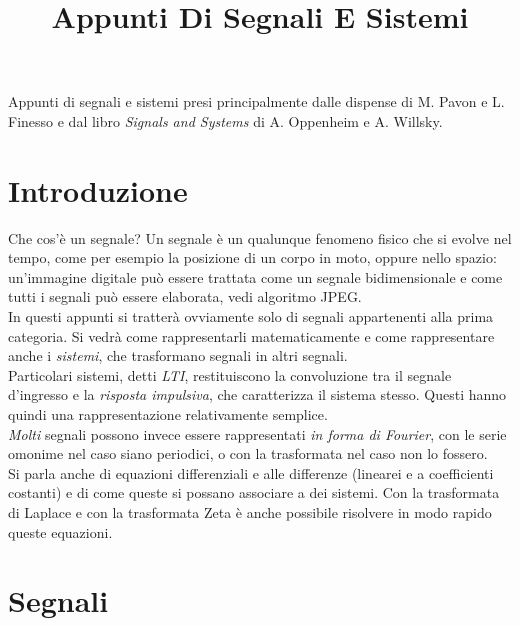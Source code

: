 \documentclass[a4paper,portrait,12pt]{article}
\theoremstyle{definition}
\begin{document}
\title{Appunti Di Segnali E Sistemi}

\maketitle
\date
\newpage

\tableofcontents
\newpage

Appunti di segnali e sistemi presi principalmente dalle dispense di M. Pavon e L. Finesso e dal libro 
\textit{Signals and Systems} di A. Oppenheim e A. Willsky.


\section{Introduzione}

Che cos'è un segnale? Un segnale è un qualunque fenomeno fisico che si evolve nel tempo, come per esempio la 
posizione di un corpo in moto, oppure nello spazio: un'immagine digitale può essere trattata come un segnale
bidimensionale e come tutti i segnali può essere elaborata, vedi algoritmo JPEG.\\
In questi appunti si tratterà ovviamente solo di segnali appartenenti alla prima categoria. Si vedrà come
rappresentarli matematicamente e come rappresentare anche i \textit{sistemi}, che trasformano segnali
in altri segnali.\\
Particolari sistemi, detti \textit{LTI}, restituiscono la convoluzione tra il segnale d'ingresso e la
\textit{risposta impulsiva}, che caratterizza il sistema stesso. Questi hanno quindi una rappresentazione
relativamente semplice.\\
\textit{Molti} segnali possono invece essere rappresentati \textit{in forma di Fourier}, con le serie
omonime nel caso siano periodici, o con la trasformata nel caso non lo fossero.\\
Si parla anche di equazioni differenziali e alle differenze (linearei e a coefficienti costanti) e di come 
queste si possano associare a dei sistemi. Con la trasformata di Laplace e con la trasformata Zeta è anche 
possibile risolvere in modo rapido queste equazioni.  
\bigskip

\section{Segnali}
\end{document}
